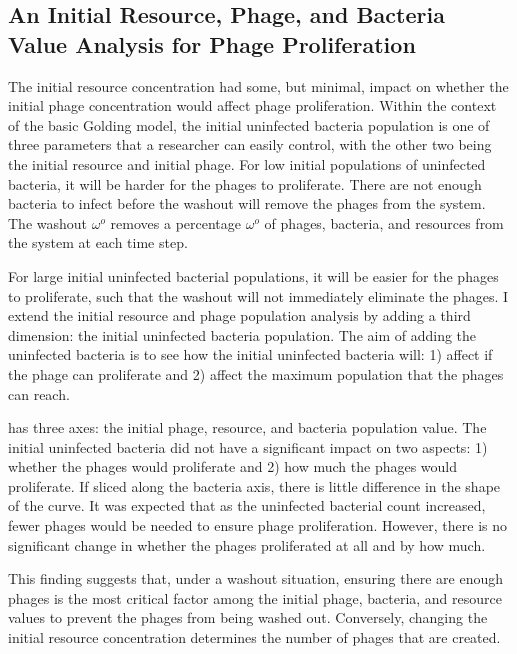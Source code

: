 \subsection{An Initial Resource, Phage, and Bacteria Value Analysis for Phage Proliferation}
The initial resource concentration had some, but minimal, impact on whether the initial phage concentration would affect phage proliferation. 
Within the context of the basic Golding model, the initial uninfected bacteria population is one of three parameters that a researcher can easily control, with the other two being the initial resource and initial phage. 
For low initial populations of uninfected bacteria, it will be harder for the phages to proliferate. 
There are not enough bacteria to infect before the washout will remove the phages from the system. 
The washout $\omega^o$ removes a percentage $\omega^o$ of phages, bacteria, and resources from the system at each time step. 

For large initial uninfected bacterial populations, it will be easier for the phages to proliferate, such that the washout will not immediately eliminate the phages. 
I extend the initial resource and phage population analysis by adding a third dimension: the initial uninfected bacteria population. 
The aim of adding the uninfected bacteria is to see how the initial uninfected bacteria will: 1) affect if the phage can proliferate and 2) affect the maximum population that the phages can reach. 

 has three axes: the initial phage, resource, and bacteria population value. 
The initial uninfected bacteria did not have a significant impact on two aspects: 1) whether the phages would proliferate and 2) how much the phages would proliferate. 
If sliced along the bacteria axis, there is little difference in the shape of the curve. 
It was expected that as the uninfected bacterial count increased, fewer phages would be needed to ensure phage proliferation. 
However, there is no significant change in whether the phages proliferated at all and by how much. 

This finding suggests that, under a washout situation, ensuring there are enough phages is the most critical factor among the initial phage, bacteria, and resource values to prevent the phages from being washed out. Conversely, changing the initial resource concentration determines the number of phages that are created. 

